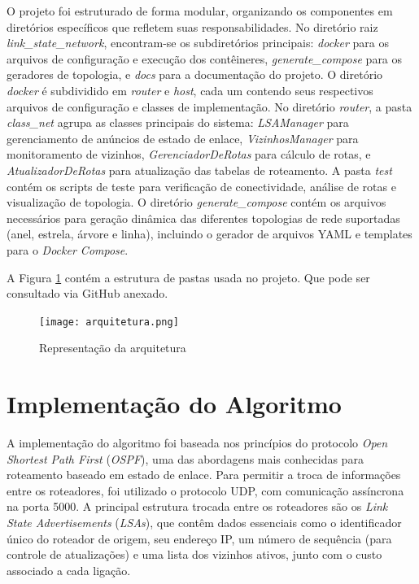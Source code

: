 \documentclass[12pt,a4paper]{report}
\begin{document}
O projeto foi estruturado de forma modular, organizando os componentes em diretórios específicos que refletem suas responsabilidades. No diretório raiz \textit{link\_state\_network}, encontram-se os subdiretórios principais: \textit{docker} para os arquivos de configuração e execução dos contêineres, \textit{generate\_compose} para os geradores de topologia, e \textit{docs} para a documentação do projeto. O diretório \textit{docker} é subdividido em \textit{router} e \textit{host}, cada um contendo seus respectivos arquivos de configuração e classes de implementação. No diretório \textit{router}, a pasta \textit{class\_net} agrupa as classes principais do sistema: \textit{LSAManager} para gerenciamento de anúncios de estado de enlace, \textit{VizinhosManager} para monitoramento de vizinhos, \textit{GerenciadorDeRotas} para cálculo de rotas, e \textit{AtualizadorDeRotas} para atualização das tabelas de roteamento. A pasta \textit{test} contém os scripts de teste para verificação de conectividade, análise de rotas e visualização de topologia. O diretório \textit{generate\_compose} contém os arquivos necessários para geração dinâmica das diferentes topologias de rede suportadas (anel, estrela, árvore e linha), incluindo o gerador de arquivos YAML e templates para o \textit{Docker Compose}.

A Figura \ref{fig:arquitetura} contém a estrutura de pastas usada no projeto. Que pode ser consultado via GitHub anexado.
\begin{figure}[h!]
    \centering
    \texttt{[image: arquitetura.png]}
    \caption{Representação da arquitetura}
    \label{fig:arquitetura}
\end{figure}

\section{Implementação do Algoritmo}

A implementação do algoritmo foi baseada nos princípios do protocolo \textit{Open Shortest Path First} (\textit{OSPF}), uma das abordagens mais conhecidas para roteamento baseado em estado de enlace. Para permitir a troca de informações entre os roteadores, foi utilizado o protocolo UDP, com comunicação assíncrona na porta 5000. A principal estrutura trocada entre os roteadores são os \textit{Link State Advertisements} (\textit{LSAs}), que contêm dados essenciais como o identificador único do roteador de origem, seu endereço IP, um número de sequência (para controle de atualizações) e uma lista dos vizinhos ativos, junto com o custo associado a cada ligação.
\end{document}
